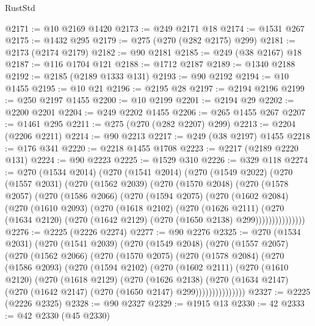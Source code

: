 \begin{lexlean}{RustStd}
\begin{coremodule}
@2171 := @10 @2169 @1420
@2173 := @249 @2171 @18
@2174 := @1531 @267
@2175 := @1432 @295
@2179 := @275 (@270 (@282 @2175) @299)
@2181 := @2173 (@2174 @2179)
@2182 := @90 @2181
@2185 := @249 (@38 @2167) @18
@2187 := @116 @1704 @121
@2188 := @1712 @2187
@2189 := @1340 @2188
@2192 := @2185 (@2189 @1333 @131)
@2193 := @90 @2192
@2194 := @10 @1455
@2195 := @10 @21
@2196 := @2195 @28
@2197 := @2194 @2196
@2199 := @250 @2197 @1455
@2200 := @10 @2199
@2201 := @2194 @29
@2202 := @2200 @2201
@2204 := @249 @2202 @1455
@2206 := @265 @1455 @267
@2207 := @1461 @295
@2211 := @275 (@270 (@282 @2207) @299)
@2213 := @2204 (@2206 @2211)
@2214 := @90 @2213
@2217 := @249 (@38 @2197) @1455
@2218 := @176 @341
@2220 := @2218 @1455 @1708
@2223 := @2217 (@2189 @2220 @131)
@2224 := @90 @2223
@2225 := @1529 @310
@2226 := @329 @118
@2274 := @270
    (@1534 @2014)
    (@270
      (@1541 @2014)
      (@270
        (@1549 @2022)
        (@270
          (@1557 @2031)
          (@270
            (@1562 @2039)
            (@270
              (@1570 @2048)
              (@270
                (@1578 @2057)
                (@270
                  (@1586 @2066)
                  (@270
                    (@1594 @2075)
                    (@270
                      (@1602 @2084)
                      (@270
                        (@1610 @2093)
                        (@270
                          (@1618 @2102)
                          (@270
                            (@1626 @2111)
                            (@270
                              (@1634 @2120)
                              (@270 (@1642 @2129) (@270 (@1650 @2138) @299)))))))))))))))
@2276 := @2225 (@2226 @2274)
@2277 := @90 @2276
@2325 := @270
    (@1534 @2031)
    (@270
      (@1541 @2039)
      (@270
        (@1549 @2048)
        (@270
          (@1557 @2057)
          (@270
            (@1562 @2066)
            (@270
              (@1570 @2075)
              (@270
                (@1578 @2084)
                (@270
                  (@1586 @2093)
                  (@270
                    (@1594 @2102)
                    (@270
                      (@1602 @2111)
                      (@270
                        (@1610 @2120)
                        (@270
                          (@1618 @2129)
                          (@270
                            (@1626 @2138)
                            (@270
                              (@1634 @2147)
                              (@270 (@1642 @2147) (@270 (@1650 @2147) @299)))))))))))))))
@2327 := @2225 (@2226 @2325)
@2328 := @90 @2327
@2329 := @1915 @13
@2330 := 42
@2333 := @42 @2330 (@45 @2330)

\end{coremodule}
\end{lexlean}
